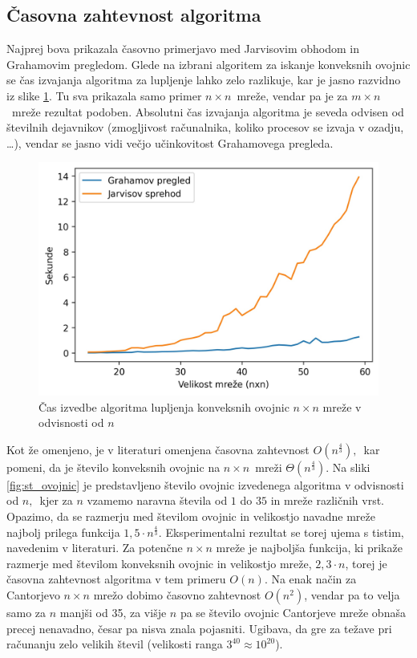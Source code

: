 \documentclass[a4paper]{article}
\begin{document}
\subsection{Časovna zahtevnost algoritma}
Najprej bova prikazala časovno primerjavo med Jarvisovim obhodom in Grahamovim pregledom. Glede na izbrani algoritem za iskanje konveksnih ovojnic se čas izvajanja algoritma za lupljenje
lahko zelo razlikuje, kar je jasno razvidno iz slike \ref{fig:cas}. Tu sva prikazala samo primer $n \times n$~mreže, vendar pa je za $m \times n$~mreže rezultat podoben. Absolutni
čas izvajanja algoritma je seveda odvisen od številnih dejavnikov (zmogljivost računalnika, koliko procesov se izvaja v ozadju, \ldots), vendar se jasno vidi
večjo učinkovitost Grahamovega pregleda.

\begin{figure}[!h]
	\centering
	\caption{Čas izvedbe algoritma lupljenja konveksnih ovojnic $n \times n$ mreže v odvisnosti od $n$}
	\label{fig:cas}
	\includegraphics[scale=0.6]{slike/cas.jpg}
\end{figure}

Kot že omenjeno, je v literaturi omenjena časovna zahtevnost $O(n ^ \frac{4}{3}),$~kar pomeni, da je število konveksnih ovojnic na $n \times n$~mreži $\Theta(n ^ \frac{4}{3})$.
Na sliki \ref{fig:st_ovojnic} je predstavljeno število ovojnic izvedenega algoritma v odvisnosti od $n,$~kjer za $n$ vzamemo naravna števila od $1$ do $35$ in mreže različnih vrst. 
Opazimo, da se razmerju med številom ovojnic in velikostjo navadne mreže najbolj prilega funkcija $1,5 \cdot n ^ \frac{4}{3}.$ Eksperimentalni rezultat se torej ujema s tistim, navedenim v 
literaturi. Za potenčne $n \times n$ mreže je najboljša funkcija, ki prikaže razmerje med številom konveksnih ovojnic in velikostjo mreže, $2,3 \cdot n$, torej je časovna zahtevnost algoritma
v tem primeru $O(n)$. Na enak način za Cantorjevo $n \times n$ mrežo dobimo časovno zahtevnost $O(n^2)$, vendar pa to velja samo za $n$ manjši od 35, za višje $n$ pa se
število ovojnic Cantorjeve mreže obnaša precej nenavadno, česar pa nisva znala pojasniti. Ugibava, da gre za težave pri računanju zelo velikih števil (velikosti ranga $3^{40} \approx 10^{20}$).
\end{document}
